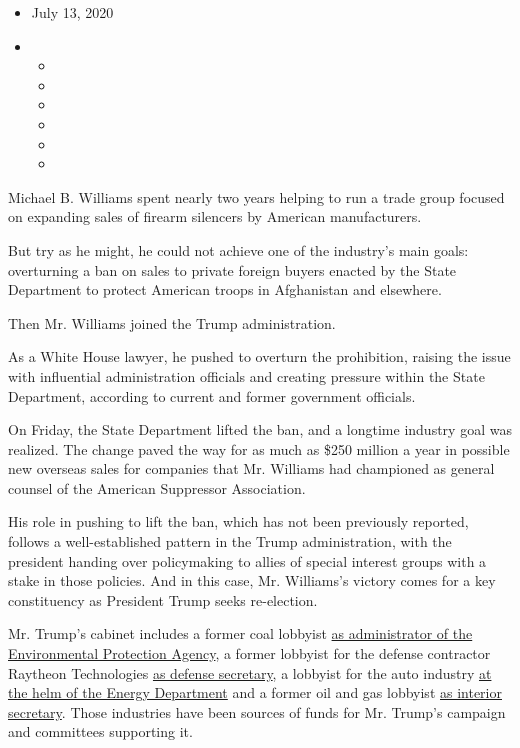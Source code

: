 \begin{itemize}
\item
  July 13, 2020
\item
  \begin{itemize}
  \item
  \item
  \item
  \item
  \item
  \item
  \end{itemize}
\end{itemize}

Michael B. Williams spent nearly two years helping to run a trade group
focused on expanding sales of firearm silencers by American
manufacturers.

But try as he might, he could not achieve one of the industry's main
goals: overturning a ban on sales to private foreign buyers enacted by
the State Department to protect American troops in Afghanistan and
elsewhere.

Then Mr. Williams joined the Trump administration.

As a White House lawyer, he pushed to overturn the prohibition, raising
the issue with influential administration officials and creating
pressure within the State Department, according to current and former
government officials.

On Friday, the State Department lifted the ban, and a longtime industry
goal was realized. The change paved the way for as much as \$250 million
a year in possible new overseas sales for companies that Mr. Williams
had championed as general counsel of the American Suppressor
Association.

His role in pushing to lift the ban, which has not been previously
reported, follows a well-established pattern in the Trump
administration, with the president handing over policymaking to allies
of special interest groups with a stake in those policies. And in this
case, Mr. Williams's victory comes for a key constituency as President
Trump seeks re-election.

Mr. Trump's cabinet includes a former coal lobbyist
\href{https://www.nytimes.com/2018/08/01/climate/andrew-wheeler-epa-lobbying.html}{as
administrator of the Environmental Protection Agency}, a former lobbyist
for the defense contractor Raytheon Technologies
\href{https://www.nytimes.com/2019/07/23/us/politics/mark-esper-secretary-defense.html}{as
defense secretary}, a lobbyist for the auto industry
\href{https://www.nytimes.com/2019/10/18/climate/trump-cabinet-lobbyists.html}{at
the helm of the Energy Department} and a former oil and gas lobbyist
\href{https://www.nytimes.com/2019/04/04/climate/david-bernhardt-interior-lobbying.html}{as
interior secretary}. Those industries have been sources of funds for Mr.
Trump's campaign and committees supporting it.

